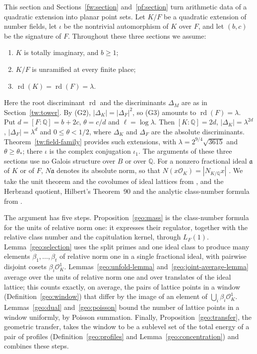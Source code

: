 \documentclass[11pt]{amsart}
\numberwithin{equation}{section}
\theoremstyle{definition}
\theoremstyle{remark}
\DeclareMathOperator{\rd}{rd}
\newcommand{\Q}{\mathbb Q}
\begin{document}
This section and Sections~\ref{fw:section} and~\ref{pf:section} turn
arithmetic data of a quadratic extension into planar point sets. Let $K/F$ be a quadratic extension of
number fields, let $\iota$ be the nontrivial automorphism of $K$ over
$F$, and let $(b,c)$ be the signature of $F$. Throughout these three
sections we assume:
\begin{enumerate}
\item[(G1)] $K$ is totally imaginary, and $b\ge1$;
\item[(G2)] $K/F$ is unramified at every finite place;
\item[(G3)] $\rd(K)=\rd(F)=\lambda$.
\end{enumerate}
Here the root discriminant $\rd$ and the discriminants $\Delta_M$ are as in
Section~\ref{tw:tower}. By (G2), $|\Delta_K|=|\Delta_F|^2$, so (G3) amounts
to $\rd(F)=\lambda$.
Put $d=[F:\Q]=b+2c$, $\theta=c/d$ and $\ell=\log\lambda$. Then
$[K:\Q]=2d$, $|\Delta_K|=\lambda^{2d}$, $|\Delta_F|=\lambda^d$ and
$0\le\theta<1/2$, where $\Delta_K$ and $\Delta_F$ are the absolute
discriminants. Theorem~\ref{tw:field-family} provides such extensions,
with $\lambda=2^{9/4}\sqrt{3615}$ and $\theta\ge\theta_*$; there $\iota$
is the complex conjugation $\iota_1$. The arguments of these three
sections use no Galois structure over $B$ or over $\Q$. For a nonzero
fractional ideal $\mathfrak a$ of $K$ or of $F$, $N\mathfrak a$ denotes
its absolute norm, so that $N(x\mathcal O_K)=|N_{K/\Q}x|$
\cite[Propositions~4.1 and~4.2]{MilneANT}. We take the unit theorem and
the covolumes of ideal lattices from \cite{MilneANT}, and the Herbrand
quotient, Hilbert's Theorem~90 and the analytic class-number formula
from \cite{MilneCFT}.

The argument has five steps. Proposition~\ref{geo:mass} is the
class-number formula for the units of relative norm one: it expresses
their regulator, together with the relative class number and the
capitulation kernel, through $L_F(1)$. Lemma~\ref{geo:selection} uses the
split primes and one ideal class to produce many elements
$\beta_1,\dots,\beta_t$ of relative norm one in a single fractional ideal,
with pairwise disjoint cosets $\beta_i\mathcal O_K^1$.
Lemmas~\ref{geo:unfold-lemma} and~\ref{geo:joint-average-lemma} average
over the units of relative norm one and over translates of the ideal
lattice; this counts exactly, on average, the pairs of lattice points in a
window (Definition~\ref{geo:window}) that differ by the image of an element
of $\bigcup_i\beta_i\mathcal O_K^1$. Lemmas~\ref{geo:dual}
and~\ref{geo:poisson} bound the number of lattice points in a window
uniformly, by Poisson summation. Finally, Proposition~\ref{geo:transfer},
the geometric transfer, takes the window to be a sublevel set of the total
energy of a pair of profiles (Definition~\ref{geo:profiles} and
Lemma~\ref{geo:concentration}) and combines these steps.
\end{document}
